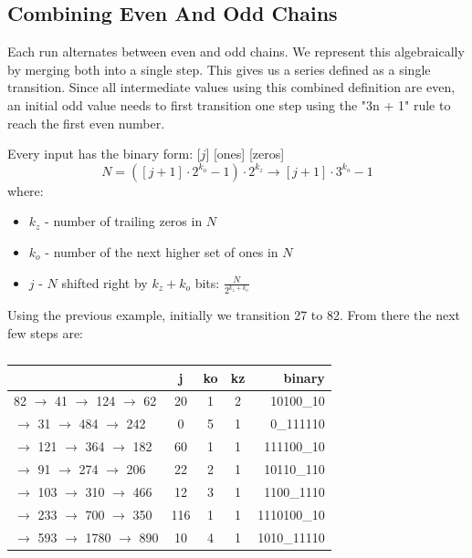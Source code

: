 \documentclass[letterpaper]{article}
\begin{document}
\begin{multicols}{2}
    \subsection{Combining Even And Odd Chains}

    Each run alternates between even and odd chains. We represent this algebraically by merging both into a single step. This gives us a series defined as a single transition. Since all intermediate values using this combined definition are even, an initial odd value needs to first transition one step using the "3n + 1" rule to reach the first even number.

    Every input has the binary form: [$j$] [ones] [zeros]
    \[
        N = ([j + 1] \cdot 2^{k_o} - 1) \cdot 2^{k_z} \rightarrow [j + 1] \cdot 3^{k_o} - 1
    \]
    where:
    \begin{itemize}
        \item $k_z$ - number of trailing zeros in $N$
        \item $k_o$ - number of the next higher set of ones in $N$
        \item $j$ - $N$ shifted right by $k_z + k_o$ bits: $\frac{N}{2^{k_z + k_o}}$
    \end{itemize}

    Using the previous example, initially we transition 27 to 82. From there the next few steps are:

    \begin{table}[th]
        \centering
        \begin{tabular}{|l|c|c|c|r|}
            \hline
                                             & \textbf{j} & \textbf{ko} & \textbf{kz} & \textbf{binary} \\
            \hline
            82 $\to$ 41  $\to$  124 $\to$ 62 & 20         & 1           & 2           & 10100\_10       \\
            \hline
            $\to$ 31  $\to$  484 $\to$ 242   & 0          & 5           & 1           & 0\_111110       \\
            \hline
            $\to$ 121 $\to$  364 $\to$ 182   & 60         & 1           & 1           & 111100\_10      \\
            \hline
            $\to$  91 $\to$  274 $\to$ 206   & 22         & 2           & 1           & 10110\_110      \\
            \hline
            $\to$ 103 $\to$  310 $\to$ 466   & 12         & 3           & 1           & 1100\_1110      \\
            \hline
            $\to$ 233 $\to$  700 $\to$ 350   & 116        & 1           & 1           & 1110100\_10     \\
            \hline
            $\to$ 593 $\to$ 1780 $\to$ 890   & 10         & 4           & 1           & 1010\_11110     \\
            \hline
        \end{tabular}
        \caption{}
    \end{table}


\end{multicols}
\end{document}
